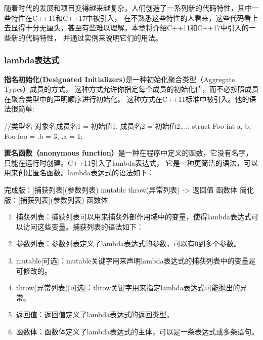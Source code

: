 随着时代的发展和项目变得越来越复杂，人们创造了一系列新的代码特性，其中一些特性在C++11和C++17中被引入，
在不熟悉这些特性的人看来，这些代码看上去显得十分无厘头，甚至有些难以理解。本章将介绍C++11和C++17中引入的一些新的代码特性，
并通过实例来说明它们的用法。
\subsubsection{lambda表达式}

\textbf{指名初始化(Designated Initializers)}是一种初始化聚合类型（Aggregate Types）成员的方式，
这种方式允许你指定每个成员的初始化值，而不必按照成员在聚合类型中的声明顺序进行初始化。
这种方式在C++11标准中被引入。他的语法很简单:

\begin{tcode}
//类型名 对象名{成员名1 = 初始值1, 成员名2 = 初始值2,...};
struct Foo {int a, b};
Foo foo = {.b = 3, .a = 1};
\end{tcode}

\textbf{匿名函数（anonymous function）}是一种在程序中定义的函数，它没有名字，只能在运行时创建。C++11引入了lambda表达式，
它是一种更简洁的语法，可以用来创建匿名函数。lambda表达式的语法如下：

\begin{tcode}
完成版：[捕获列表](参数列表) mutable throw(异常列表) -> 返回值 {函数体}
简化版：[捕获列表](参数列表) {函数体}
\end{tcode}    

\begin{enumerate}
    \item 捕获列表：捕获列表可以用来捕获外部作用域中的变量，使得lambda表达式可以访问这些变量。捕获列表的语法如下：
    \item 参数列表：参数列表定义了lambda表达式的参数，可以有0到多个参数。
    \item mutable[可选]：mutable关键字用来声明lambda表达式的捕获列表中的变量是可修改的。
    \item throw(异常列表)[可选]：throw关键字用来指定lambda表达式可能抛出的异常。
    \item 返回值：返回值定义了lambda表达式的返回类型。
    \item 函数体：函数体定义了lambda表达式的主体，可以是一条表达式或多条语句。
\end{enumerate}

